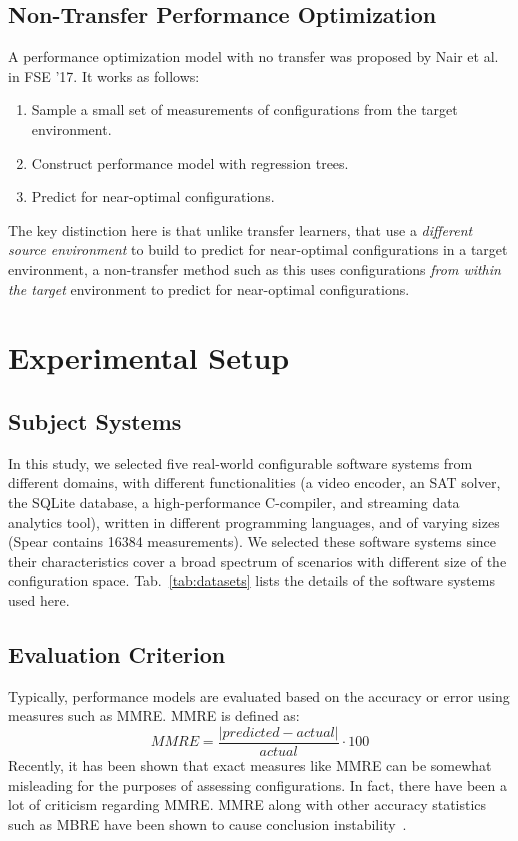 \documentclass[10pt,journal,compsoc]{IEEEtran}
\newcommand{\tab}[1]{Tab.~\ref{tab:#1}}
\newcommand{\be}{\begin{enumerate}}
\newcommand{\ee}{\end{enumerate}}
\begin{document}
\subsection{Non-Transfer Performance Optimization}
\label{sect:nair}
A performance optimization model with no transfer was proposed by Nair et al.~\cite{nair2017using} in FSE '17. It works as follows: 
\be[leftmargin=*]
\item Sample a small set of measurements of configurations from the target environment.
\item Construct performance model with regression trees. 
\item Predict for near-optimal configurations. 
\ee
The key distinction here is that unlike transfer learners, that use a \textit{different source environment} to build to predict for near-optimal configurations in a target environment, a non-transfer method such as this uses configurations \textit{from within the target} environment to predict for near-optimal configurations. 

\section{Experimental Setup}
\label{sect:expt}
\subsection{Subject Systems}
\label{sect:datasets}
In this study, we selected five real-world configurable software systems from different domains, with different functionalities (a video encoder, an SAT solver, the SQLite database, a high-performance C-compiler, and streaming data analytics tool), written in different programming languages, and of varying sizes (Spear contains 16384 measurements). We selected these software systems since their characteristics cover a broad spectrum of scenarios with different size of the configuration space. \tab{datasets} lists the details of the software systems used here.

\subsection{Evaluation Criterion}
\label{sect:eval}
Typically, performance models are evaluated based on the accuracy or error using measures such as MMRE. 
 MMRE is defined as:
\[
    MMRE = \frac{|predicted-actual|}{actual} \cdot 100
\]
Recently, it has been shown that exact measures like MMRE
can be somewhat misleading for the purposes of assessing
configurations.
In fact, there have been a lot of criticism regarding MMRE. MMRE along with other accuracy statistics such as MBRE have been shown to cause conclusion instability~\cite{myrtveit2012validity, myrtveit2005reliability, foss2003simulation}.
\end{document}
